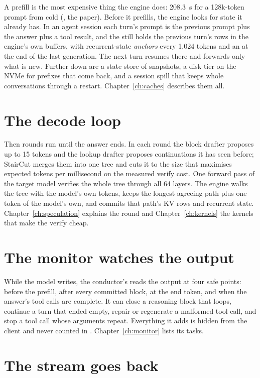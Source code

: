 A prefill is the most expensive thing the engine does: 208.3~s for a 128k-token prompt from cold (\measured, the paper). Before it prefills, the engine looks for state it already has. In an agent session each turn's prompt is the previous prompt plus the answer plus a tool result, and the  still holds the previous turn's rows in the engine's own buffers, with recurrent-state \emph{anchors} every 1,024 tokens and an  at the end of the last generation. The next turn resumes there and forwards only what is new. Further down are a state store of snapshots, a disk tier on the NVMe for prefixes that come back, and a session spill that keeps whole conversations through a restart. Chapter~\ref{ch:caches} describes them all.

\section{The decode loop}

Then rounds run until the answer ends. In each round the block drafter proposes up to 15 tokens and the lookup drafter proposes continuations it has seen before; StairCut merges them into one tree and cuts it to the size that maximises expected tokens per millisecond on the measured verify cost. One forward pass of the target model verifies the whole tree through all 64 layers. The engine walks the tree with the model's own tokens, keeps the longest agreeing path plus one token of the model's own, and commits that path's KV rows and recurrent state. Chapter~\ref{ch:speculation} explains the round and Chapter~\ref{ch:kernels} the kernels that make the verify cheap.

\section{The monitor watches the output}

While the model writes, the conductor's  reads the output at four safe points: before the prefill, after every committed block, at the end token, and when the answer's tool calls are complete. It can close a reasoning block that loops, continue a turn that ended empty, repair or regenerate a malformed tool call, and stop a tool call whose arguments repeat. Everything it adds is hidden from the client and never counted in . Chapter~\ref{ch:monitor} lists its tasks.

\section{The stream goes back}

